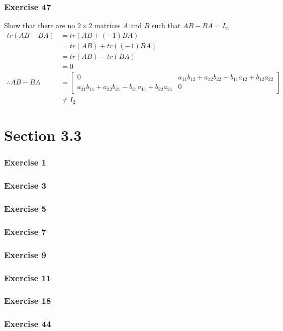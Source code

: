 \documentclass[letterpaper, 12pt]{math}
\begin{document}
\subsubsection*{Exercise 47}
Show that there are no \( 2\times2 \) matrices \( A \) and \( B \) such that
\( AB-BA = I_2 \).
\begin{align*}
  tr(AB-BA) &= tr(AB+(-1)BA) \\
  &= tr(AB)+tr((-1)BA) \\
  &= tr(AB)-tr(BA) \\
  &= 0 \\
  \therefore AB-BA &= \begin{bmatrix}
    0 & a_{11}b_{12}+a_{12}b_{22}-b_{11}a_{12}+b_{12}a_{22} \\
    a_{21}b_{11}+a_{22}b_{21}-b_{21}a_{11}+b_{22}a_{21} & 0
  \end{bmatrix} \\
  &\ne I_2
\end{align*}

\section*{Section 3.3}
\subsubsection*{Exercise 1}
\subsubsection*{Exercise 3}
\subsubsection*{Exercise 5}
\subsubsection*{Exercise 7}
\subsubsection*{Exercise 9}
\subsubsection*{Exercise 11}
\subsubsection*{Exercise 18}
\subsubsection*{Exercise 44}
\end{document}
